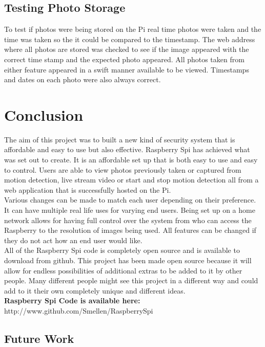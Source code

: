 \documentclass[]{report}
\begin{document}
\section{Testing Photo Storage}
\label{sec:photoStorageTest}
%
To test if photos were being stored on the Pi real time photos were taken and the time was taken  so the it could be compared to the timestamp. The web address where all photos are stored was checked to see if the image appeared with the correct time stamp and the expected photo appeared. All photos taken from either feature appeared in a swift manner available to be viewed. Timestamps and dates on each photo were also always correct.\\


\chapter{Conclusion}
\label{ch:concl}
%
%
%
%
The aim of this project was to built a new kind of security system that is affordable and easy to use but also effective. Raspberry Spi has achieved what was set out to create. It is an affordable set up that is both easy to use and easy to control. Users are able to view photos previously taken or captured from motion detection, live stream video or start and stop motion detection all from a web application that is successfully hosted on the Pi. \\

Various changes can be made to match each user depending on their preference. It can have multiple real life uses for varying end users. Being set up on a home network allows for having full control over the system from who can access the Raspberry to the resolution of images being used. All features can be changed if they do not act how an end user would like.\\

All of the Raspberry Spi code is completely open source and is available to download from github. This project has been made open source because it will allow for endless possibilities of additional extras to be added to it by other people. Many different people might see this project in a different way and could add to it their own completely unique and different ideas.\\
\noindent
{\bf Raspberry Spi Code is available here:\\}
{http://www.github.com/Smellen/RaspberrySpi}




\section{Future Work}
\label{sec:future}
\end{document}
